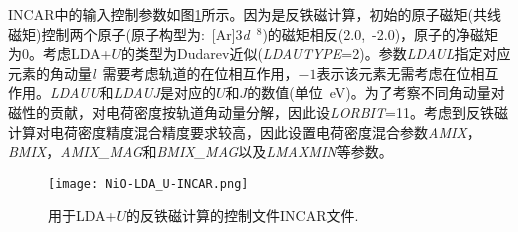\textrm{INCAR}中的输入控制参数如图\ref{NiO-LDA_U-INCAR}所示。因为是反铁磁计算，初始的原子磁矩(共线磁矩)控制两个原子(原子构型为:~\textrm{[Ar]3\textit{d}~$^8$})的磁矩相反(2.0,~-2.0)，原子的净磁矩为0。考虑\textrm{LDA}+$U$的类型为\textrm{Dudarev}近似(\textit{LDAUTYPE}=2)。参数\textit{LDAUL}指定对应元素的角动量\textit{l}~需要考虑轨道的在位相互作用，$-1$表示该元素无需考虑在位相互作用。\textit{LDAUU}和\textit{LDAUJ}是对应的$U$和$J$的数值(单位~\textrm{eV})。为了考察不同角动量对磁性的贡献，对电荷密度按轨道角动量分解，因此设\textit{LORBIT}=11。考虑到反铁磁计算对电荷密度精度混合精度要求较高，因此设置电荷密度混合参数\textit{AMIX}，\textit{BMIX}，\textit{AMIX\_MAG}和\textit{BMIX\_MAG}以及\textit{LMAXMIN}等参数。

\begin{figure}[h!]
\centering
\texttt{[image: NiO-LDA\_U-INCAR.png]}
\caption{\small \textrm{用于\textrm{LDA}+$U$的反铁磁计算的控制文件\textrm{INCAR}文件.}}%
\label{NiO-LDA_U-INCAR}
\end{figure}

